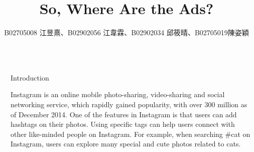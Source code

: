 \documentclass[final,hyperref={pdfpagelabels=false}]{beamer}
\title{\huge So, Where Are the Ads?} %
\author{B02705008 江昱熹、B02902056 江韋霖、B02902034 邱筱晴、B02705019陳姿穎} %
\institute{Computer Science and Information Engineering, National Taiwan University } %
\begin{document}

\begin{frame}[t] %

\begin{columns}[t] %

\begin{column}{.02\textwidth}\end{column} %

\begin{column}{.465\textwidth} %





            
\begin{block}{Introduction}

\par Instagram is an online mobile photo-sharing, video-sharing and social networking service, which rapidly gained popularity, with over 300 million as of December 2014. One of the features in Instagram is that users can add hashtags on their photos. Using specific tags can help users connect with other like-minded people on Instagram. For example, when searching \#cat on Instagram, users can explore many special and cute photos related to cats. 


\end{block}
\end{column}
\end{columns}
\end{frame}
\end{document}

